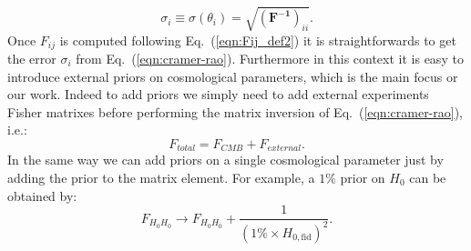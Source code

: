 \documentclass[aps,prd,preprint,groupedaddress]{revtex4-1}
\newcommand\refeq[1]{Eq.~(\ref{eqn:#1})}
\begin{document}
\begin{equation}
\sigma_i \equiv \sigma (\theta_i) = \sqrt{(\mathbf{ F^{-1}})_{ii}}.
\label{eqn:cramer-rao}
\end{equation}
Once $F_{ij}$ is computed following \refeq{Fij_def2} it is straightforwards to get the error $\sigma_i$ from \refeq{cramer-rao}. Furthermore in this context it is easy to introduce external priors on cosmological parameters, which is the main focus or our work.
Indeed to add priors we simply need to add external experiments Fisher matrixes before performing the matrix inversion of \refeq{cramer-rao}, i.e.:
\begin{equation}
F_{total}=F_{CMB}+F_{external}.
\end{equation}
In the same way we can add priors on a single cosmological parameter just by adding the prior to the matrix element.
For example, a $1\%$ prior on $H_{0}$ can be obtained by:
\begin{equation}
F_{H_0 H_0} \rightarrow F_{H_0 H_0} + \frac{1}{(1\% \times H_{0,\text{fid}})^2}.
\end{equation}
\end{document}
